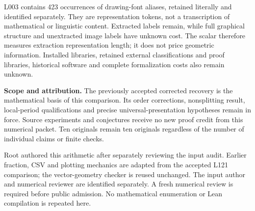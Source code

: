 \documentclass[11pt,a4paper]{article}
\begin{document}
L003 contains 423 occurrences of drawing-font aliases, retained literally and identified separately. They are representation tokens, not a transcription of mathematical or linguistic content. Extracted labels remain, while full graphical structure and unextracted image labels have unknown cost. The scalar therefore measures extraction representation length; it does not price geometric information. Installed libraries, retained external classifications and proof libraries, historical software and complete formalization costs also remain unknown.

\textbf{Scope and attribution.} The previously accepted corrected recovery is the mathematical basis of this comparison. Its order corrections, nonsplitting result, local-period qualifications and precise universal-presentation hypotheses remain in force. Source experiments and conjectures receive no new proof credit from this numerical packet. Ten originals remain ten originals regardless of the number of individual claims or finite checks.

Root authored this arithmetic after separately reviewing the input audit. Earlier fraction, CSV and plotting mechanics are adapted from the accepted L121 comparison; the vector-geometry checker is reused unchanged. The input author and numerical reviewer are identified separately. A fresh numerical review is required before public admission. No mathematical enumeration or Lean compilation is repeated here.
\end{document}
